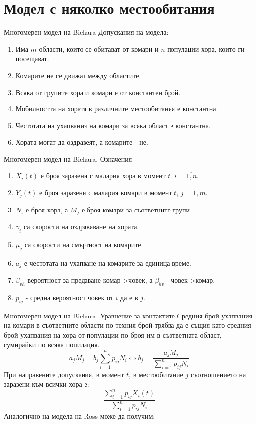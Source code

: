 \section{Модел с няколко местообитания}
\begin{frame}[t]{Многомерен модел на Bichara}
  Допускания на модела:
  \begin{enumerate}
    \item Има $m$ области, които се обитават от комари и $n$ популации хора, които ги посещават.
    \item Комарите не се движат между областите.
    \item Всяка от групите хора и комари е от константен брой.
    \item Мобилността на хората в различните местообитания е константна.
    \item Честотата на ухапвания на комари за всяка област е константна.
    \item Хората могат да оздравеят, а комарите - не.
  \end{enumerate}
\end{frame}

\begin{frame}[t]{Многомерен модел на Bichara. Означения}
  \begin{enumerate}
    \item $X_i(t)$ е броя заразени с малария хора в момент $t$, $i=\overline{1,n}$.
    \item $Y_j(t)$ е броя заразени с малария комари в момент $t$, $j=\overline{1,m}$.
    \item $N_i$ е броя хора, а $M_j$ е броя комари за съответните групи.
    \item $\gamma_i$ са скорости на оздравяване на хората.
    \item $\mu_j$ са скорости на смъртност на комарите.
    \item $a_j$ е честотата на ухапване на комарите за единица време.
    \item $\beta_{vh}$ вероятност за предаване комар->човек, а $\beta_{hv}$ - човек->комар.
    \item $p_{ij}$ - средна вероятност човек от $i$ да е в $j$.
  \end{enumerate}
\end{frame}

\begin{frame}[t]{Многомерен модел на Bichara. Уравнение за контактите}
  Средния брой ухапвания на комари в съответните области по техния брой трябва да е същия като средния брой ухапвания на хора от популации по броя им в съответната област, сумирайки по всяка попилация.
  \begin{equation}
    a_j M_j = b_j \sum_{i=1}^n p_{ij} N_i \iff b_j = \frac{a_j M_j}{\sum_{i=1}^n p_{ij} N_i}
  \end{equation}
  При направените допускания, в момент $t$, в местообитание $j$ съотношението на заразени към всички хора е:
  \begin{equation}
    \frac{\sum_{i=1}^n p_{ij} X_i(t)}{\sum_{i=1}^n p_{ij} N_i}
  \end{equation}
  Аналогично на модела на Ross може да получим:
\end{frame}

